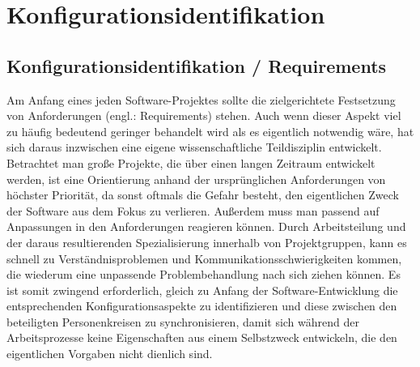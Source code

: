 \chapter{Konfigurationsidentifikation}
\section{Konfigurationsidentifikation / Requirements}
Am Anfang eines jeden Software-Projektes sollte die zielgerichtete Festsetzung von Anforderungen (engl.: Requirements) stehen. Auch wenn dieser Aspekt viel zu häufig bedeutend geringer behandelt wird als es eigentlich notwendig wäre, hat sich daraus inzwischen eine eigene wissenschaftliche Teildisziplin entwickelt. Betrachtet man große Projekte, die über einen langen Zeitraum entwickelt werden, ist eine Orientierung anhand der ursprünglichen Anforderungen von höchster Priorität, da sonst oftmals die Gefahr besteht, den eigentlichen Zweck der Software aus dem Fokus zu verlieren. Außerdem muss man passend auf Anpassungen in den Anforderungen reagieren können. Durch Arbeitsteilung und der daraus resultierenden Spezialisierung innerhalb von Projektgruppen, kann es schnell zu Verständnisproblemen und Kommunikationsschwierigkeiten kommen, die wiederum eine unpassende Problembehandlung nach sich ziehen können. Es ist somit zwingend erforderlich, gleich zu Anfang der Software-Entwicklung die entsprechenden Konfigurationsaspekte zu identifizieren und diese zwischen den beteiligten Personenkreisen zu synchronisieren, damit sich während der Arbeitsprozesse keine Eigenschaften aus einem Selbstzweck entwickeln, die den eigentlichen Vorgaben nicht dienlich sind.
%
